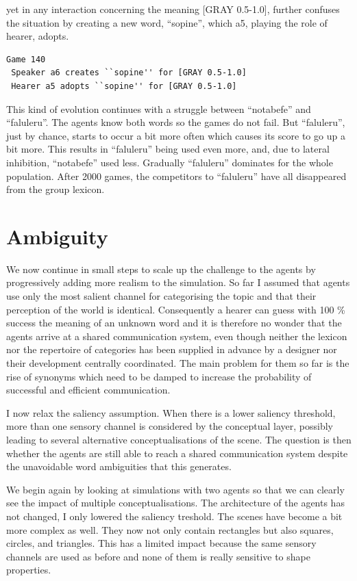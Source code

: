 yet in any interaction concerning the 
meaning [GRAY 0.5-1.0], further confuses the situation by 
creating a new word, ``sopine'', which {\bfshape  a5}, playing
the role of hearer, adopts. 
\begin{verbatim}
Game 140
 Speaker a6 creates ``sopine'' for [GRAY 0.5-1.0]
 Hearer a5 adopts ``sopine'' for [GRAY 0.5-1.0]
\end{verbatim}
This kind of evolution continues with a struggle between 
``notabefe'' and ``faluleru''. The agents know both 
words so the games do not fail. But ``faluleru'', 
just by chance, starts to occur a bit more often
which causes its score to go up a bit more. 
This results in ``faluleru'' being used even more, 
and, due to lateral inhibition, ``notabefe'' used 
less. Gradually ``faluleru'' dominates for 
the whole population. 
After 2000 games, the competitors to ``faluleru'' have 
all disappeared from the group lexicon. 

\section{Ambiguity} 

We now continue in small steps to scale up the
challenge to the agents by progressively 
adding more realism to the simulation. So far I 
assumed that agents use only 
the most salient channel for categorising the topic
and that their perception of the world is identical.
Consequently a hearer can guess with 100 \% success the
meaning of an unknown word and 
it is therefore no wonder that the agents arrive at a 
shared communication system, 
even though neither the lexicon nor the repertoire
of categories has been supplied in advance by a 
designer nor their development centrally
coordinated. The main problem for them so far is 
the rise of synonyms which need to be damped to 
increase the probability of successful and 
efficient communication. 

I now relax the saliency assumption. When 
there is a lower saliency threshold, more than one
sensory channel is considered by the conceptual 
layer, possibly leading to several alternative
conceptualisations of the scene. The question is 
then whether the agents are still able to reach 
a shared communication system despite the unavoidable
word ambiguities that this generates. 

We begin again by looking at simulations
with two agents so that we 
can clearly see the impact of multiple conceptualisations. 
The architecture of the agents has not changed, I only 
lowered the saliency treshold. 
The scenes have become a bit more complex as well. They 
now not only contain rectangles but also squares, circles, 
and triangles. This has a limited impact because the 
same sensory channels are used as before and none of them 
is really sensitive to shape properties. 



